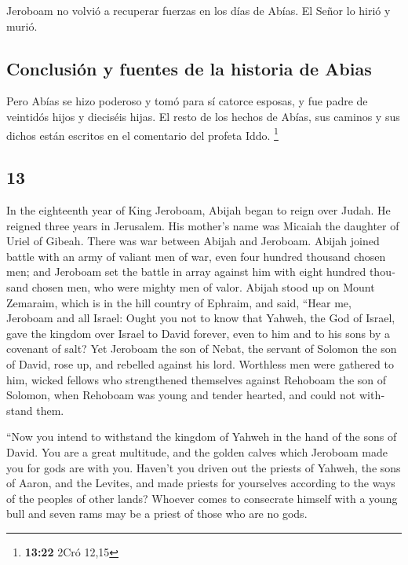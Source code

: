 \begin{paracol}{2}
 Jeroboam no volvió a recuperar fuerzas en los días de
Abías. El Señor lo hirió y murió.

\hypertarget{conclusiuxf3n-y-fuentes-de-la-historia-de-abias}{%
\subsection{Conclusión y fuentes de la historia de
Abias}\label{conclusiuxf3n-y-fuentes-de-la-historia-de-abias}}

 Pero Abías se hizo poderoso y tomó para sí catorce
esposas, y fue padre de veintidós hijos y dieciséis hijas.
 El resto de los hechos de Abías, sus caminos y sus
dichos están escritos en el comentario del profeta Iddo. \footnote{\textbf{13:22}
  2Cró 12,15}

\switchcolumn
\begin{otherlanguage}{english}

\hypertarget{section-25}{%
\section{13}\label{section-25}}

 In the eighteenth year of King Jeroboam, Abijah began to
reign over Judah.  He reigned three years in Jerusalem.
His mother's name was Micaiah the daughter of Uriel of Gibeah. There was
war between Abijah and Jeroboam.  Abijah joined battle
with an army of valiant men of war, even four hundred thousand chosen
men; and Jeroboam set the battle in array against him with eight hundred
thousand chosen men, who were mighty men of valor.  Abijah
stood up on Mount Zemaraim, which is in the hill country of Ephraim, and
said, ``Hear me, Jeroboam and all Israel:  Ought you not
to know that Yahweh, the God of Israel, gave the kingdom over Israel to
David forever, even to him and to his sons by a covenant of salt?
 Yet Jeroboam the son of Nebat, the servant of Solomon the
son of David, rose up, and rebelled against his lord. 
Worthless men were gathered to him, wicked fellows who strengthened
themselves against Rehoboam the son of Solomon, when Rehoboam was young
and tender hearted, and could not withstand them.

 ``Now you intend to withstand the kingdom of Yahweh in
the hand of the sons of David. You are a great multitude, and the golden
calves which Jeroboam made you for gods are with you. 
Haven't you driven out the priests of Yahweh, the sons of Aaron, and the
Levites, and made priests for yourselves according to the ways of the
peoples of other lands? Whoever comes to consecrate himself with a young
bull and seven rams may be a priest of those who are no gods.


\end{otherlanguage}
\end{paracol}
